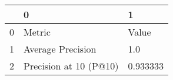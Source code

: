 \begin{tabular}{lll}
\toprule
{} &                       0 &         1 \\
\midrule
0 &                  Metric &     Value \\
1 &       Average Precision &       1.0 \\
2 &  Precision at 10 (P@10) &  0.933333 \\
\bottomrule
\end{tabular}
